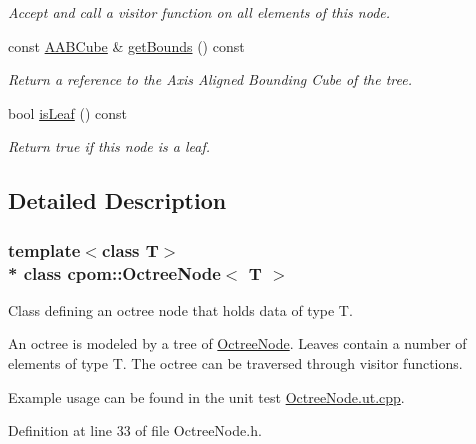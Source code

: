 \begin{DoxyCompactItemize}
\begin{DoxyCompactList}\small\item\em Accept and call a visitor function on all elements of this node. \end{DoxyCompactList}\item 
const \hyperlink{structcpom_1_1_a_a_b_cube}{A\+A\+B\+Cube} \& \hyperlink{classcpom_1_1_octree_node_a9a79ab665626c3c2a6f97aeabe3ff850}{get\+Bounds} () const \hypertarget{classcpom_1_1_octree_node_a9a79ab665626c3c2a6f97aeabe3ff850}{}\label{classcpom_1_1_octree_node_a9a79ab665626c3c2a6f97aeabe3ff850}

\begin{DoxyCompactList}\small\item\em Return a reference to the Axis Aligned Bounding Cube of the tree. \end{DoxyCompactList}\item 
bool \hyperlink{classcpom_1_1_octree_node_a653c782edb053eb55d91265ad156008e}{is\+Leaf} () const \hypertarget{classcpom_1_1_octree_node_a653c782edb053eb55d91265ad156008e}{}\label{classcpom_1_1_octree_node_a653c782edb053eb55d91265ad156008e}

\begin{DoxyCompactList}\small\item\em Return true if this node is a leaf. \end{DoxyCompactList}\end{DoxyCompactItemize}


\subsection{Detailed Description}
\subsubsection*{template$<$class T$>$\\*
class cpom\+::\+Octree\+Node$<$ T $>$}

Class defining an octree node that holds data of type T. 

An octree is modeled by a tree of \hyperlink{classcpom_1_1_octree_node}{Octree\+Node}. Leaves contain a number of elements of type T. The octree can be traversed through visitor functions.

Example usage can be found in the unit test \hyperlink{_octree_node_8ut_8cpp}{Octree\+Node.\+ut.\+cpp}. 

Definition at line 33 of file Octree\+Node.\+h.



